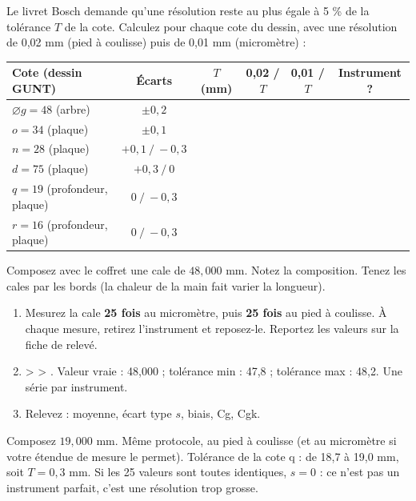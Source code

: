 \documentclass[10pt,a4paper]{article}
\begin{document}
Le livret Bosch demande qu'une résolution reste au plus égale à 5 \% de la tolérance $T$ de la cote. Calculez pour chaque cote du dessin, avec une résolution de 0,02 mm (pied à coulisse) puis de 0,01 mm (micromètre) :
\begin{center}
\begin{tabularx}{0.95\linewidth}{|l|c|c|c|c|c|}
\hline
\rowcolor{fond}\textbf{Cote (dessin GUNT)} & \textbf{Écarts} & \textbf{$T$ (mm)} & \textbf{0,02 / $T$} & \textbf{0,01 / $T$} & \textbf{Instrument ?}\\\hline
$\varnothing g = 48$ (arbre) & $\pm 0{,}2$ & & & & \\\hline
$o = 34$ (plaque) & $\pm 0{,}1$ & & & & \\\hline
$n = 28$ (plaque) & $+0{,}1\ /\ -0{,}3$ & & & & \\\hline
$d = 75$ (plaque) & $+0{,}3\ /\ 0$ & & & & \\\hline
$q = 19$ (profondeur, plaque) & $0\ /\ -0{,}3$ & & & & \\\hline
$r = 16$ (profondeur, plaque) & $0\ /\ -0{,}3$ & & & & \\\hline
\end{tabularx}
\end{center}

 \tagE
Composez avec le coffret une cale de $48{,}000$ mm. Notez la composition. Tenez les cales par les bords (la chaleur de la main fait varier la longueur).
\begin{enumerate}[label=\textcolor{cyan}{\textbf{\arabic*.}},leftmargin=15pt,itemsep=1.5pt]
\item Mesurez la cale \textbf{25 fois} au micromètre, puis \textbf{25 fois} au pied à coulisse. À chaque mesure, retirez l'instrument et reposez-le. Reportez les valeurs sur la fiche de relevé.
\item {} >  > . Valeur vraie : 48{,}000 ; tolérance min : 47{,}8 ; tolérance max : 48{,}2. Une série par instrument.
\item Relevez : moyenne, écart type $s$, biais, Cg, Cgk.
\end{enumerate}

Composez $19{,}000$ mm. Même protocole, au pied à coulisse (et au micromètre si votre étendue de mesure le permet). Tolérance de la cote q : de 18,7 à 19,0 mm, soit $T = 0{,}3$ mm. Si les 25 valeurs sont toutes identiques, $s = 0$ : ce n'est pas un instrument parfait, c'est une résolution trop grosse.
\end{document}
